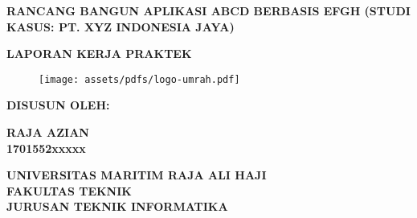 %
%
%

\begin{titlepage}
    \thispagestyle{empty}
    \begin{center}
        \begin{large}\begin{spacing}{1}
                \textbf{RANCANG BANGUN APLIKASI ABCD BERBASIS EFGH (STUDI KASUS: PT. XYZ INDONESIA JAYA)}
            \end{spacing}\end{large}

        \vspace{2cm}
        \textbf{LAPORAN KERJA PRAKTEK}

        \vspace{1cm}
        \begin{figure}[h]
            \centering
            \texttt{[image: assets/pdfs/logo-umrah.pdf]}
            \label{fig:universitylogo}
        \end{figure}

        \vspace{1cm}
        \textbf{DISUSUN OLEH:}

        \vspace{1cm}
        \textbf{RAJA AZIAN \\
            1701552xxxxx}

        \vspace{2cm}
        \textbf{UNIVERSITAS MARITIM RAJA ALI HAJI\\
            FAKULTAS TEKNIK\\
            JURUSAN TEKNIK INFORMATIKA\\}

        \vspace{\baselineskip}
        \textbf{\large \the\year{}}
    \end{center}
\end{titlepage}